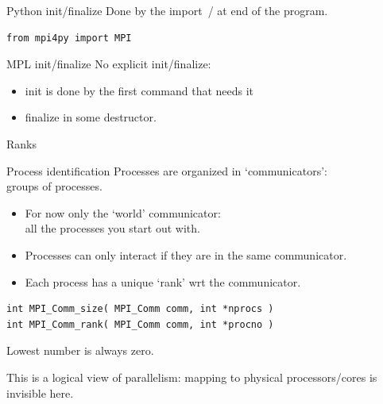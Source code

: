 \begin{python}
  \addtocounter{slidecount}{-1}
\begin{numberedframe}{Python init/finalize}
    Done by the import~/ at end of the program.
\begin{lstlisting}[language=bash,numbers=none]
from mpi4py import MPI
\end{lstlisting}
\end{numberedframe}
\end{python}

\begin{mpl}
  \addtocounter{slidecount}{-1}
\begin{numberedframe}{MPL init/finalize}
    No explicit init/finalize:
    \begin{itemize}
    \item init is done by the first command that needs it
    \item finalize in some destructor.
    \end{itemize}
\end{numberedframe}
\end{mpl}

\begin{exerciseframe}[hello]
  
\end{exerciseframe}

 {Ranks}

\begin{numberedframe}{Process identification}
  \label{sl:comm-world}
  Processes are organized in `communicators':\\
  groups of processes.
  \begin{itemize}
  \item For now only the `world' communicator: \\
    all the processes you start out with.
  \item Processes can only interact if they are
    in the same communicator.
  \item Each process has a unique `rank' wrt the communicator.
  \end{itemize}
\lstset{language=C}
\begin{lstlisting}[numbers=none]
int MPI_Comm_size( MPI_Comm comm, int *nprocs )
int MPI_Comm_rank( MPI_Comm comm, int *procno )
\end{lstlisting}
Lowest number is always zero.

This is a logical view of parallelism: mapping to physical
processors/cores is invisible here.
\end{numberedframe}

